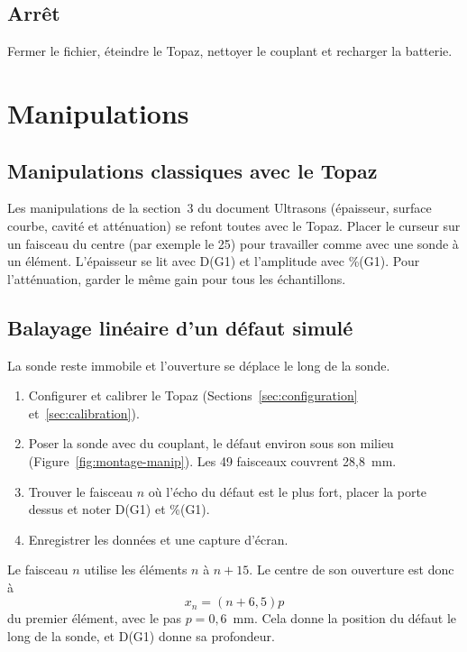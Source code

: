 \documentclass[11pt,letterpaper]{article}
\begin{document}
\subsection{Arr\^et}

Fermer le fichier, \'eteindre le Topaz, nettoyer le couplant et recharger la batterie.

\section{Manipulations}
\label{sec:manipulations}

\subsection{Manipulations classiques avec le Topaz}

Les manipulations de la section~3 du document Ultrasons (\'epaisseur, surface courbe, cavit\'e et att\'enuation) se refont toutes avec le Topaz. Placer le curseur sur un faisceau du centre (par exemple le 25) pour travailler comme avec une sonde \`a un \'el\'ement. L'\'epaisseur se lit avec D(G1) et l'amplitude avec \%(G1). Pour l'att\'enuation, garder le m\^eme gain pour tous les \'echantillons.

\subsection{Balayage lin\'eaire d'un d\'efaut simul\'e}
\label{sec:manip-lineaire}

La sonde reste immobile et l'ouverture se d\'eplace le long de la sonde.

\begin{enumerate}
  \item Configurer et calibrer le Topaz (Sections~\ref{sec:configuration} et~\ref{sec:calibration}).
  \item Poser la sonde avec du couplant, le d\'efaut environ sous son milieu (Figure~\ref{fig:montage-manip}). Les 49 faisceaux couvrent 28,8~mm.
  \item Trouver le faisceau $n$ o\`u l'\'echo du d\'efaut est le plus fort, placer la porte dessus et noter D(G1) et \%(G1).
  \item Enregistrer les donn\'ees et une capture d'\'ecran.
\end{enumerate}

Le faisceau $n$ utilise les \'el\'ements $n$ \`a $n+15$. Le centre de son ouverture est donc \`a
\begin{equation}
x_n = \left(n + 6{,}5\right) p
\label{eq:position}
\end{equation}
du premier \'el\'ement, avec le pas $p = 0{,}6$~mm. Cela donne la position du d\'efaut le long de la sonde, et D(G1) donne sa profondeur.
\end{document}
